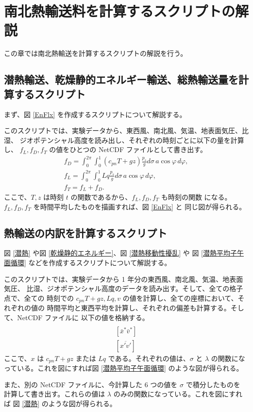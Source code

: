 \documentclass[body]{subfiles}
\begin{document}
\chapter{南北熱輸送料を計算するスクリプトの解説}

この章では南北熱輸送を計算するスクリプトの解説を行う。

\section{潜熱輸送、乾燥静的エネルギー輸送、総熱輸送量を計算するスクリプト}

まず、図 \ref{EnFlx} を作成するスクリプトについて解説する。

このスクリプトでは、実験データから、東西風、南北風、気温、地表面気圧、比湿、
ジオポテンシャル高度を読み出し、それぞれの時刻ごとに以下の量を計算し、
\(f_L,f_D,f_T\) の値をひとつの NetCDF ファイルとして書き出す。
\begin{gather}
	f_D=\int^{2\pi}_0\int^1_0 (c_{pn}T+gz)\frac{p_s}{g}d\sigma\,a\cos\varphi\,d\varphi,\\
	f_L=\int^{2\pi}_0\int^1_0 Lq\frac{p_s}{g}d\sigma\,a\cos\varphi\,d\varphi,\\
	f_T=f_L+f_D.
\end{gather}
ここで、\(T,z\) は時刻 \(t\) の関数であるから、\(f_L,f_D,f_T\) も時刻の関数
になる。\(f_L,f_D,f_T\) を時間平均したものを描画すれば、図 \ref{EnFlx} と
同じ図が得られる。

\section{熱輸送の内訳を計算するスクリプト}

図 \ref{潜熱} や図 \ref{乾燥静的エネルギー}、図 \ref{潜熱移動性擾乱} や
図 \ref{潜熱平均子午面循環} などを作成するスクリプトについて解説する。

このスクリプトでは、実験データから 1 年分の東西風、南北風、気温、地表面気圧、
比湿、ジオポテンシャル高度のデータを読み出す。そして、全ての格子点で、全ての
時刻での \(c_{pn}T+gz, Lq, v\) の値を計算し、全ての座標において、それぞれの値の
時間平均と東西平均を計算し、それぞれの偏差も計算する。そして、NetCDF ファイルに
以下の値を格納する。
\begin{gather}
	[\bar v][\bar v]\\
	[\bar x^*\bar v^*]\\
	[\overline{x'v'}]
\end{gather}
ここで、\(x\) は \(c_{pn}T+gz\) または \(Lq\) である。それぞれの値は、\(\sigma\)
と \(\lambda\) の関数になっている。これを図にすれば図 \ref{潜熱平均子午面循環}
のような図が得られる。

また、別の NetCDF ファイルに、今計算した 6 つの値を \(\sigma\) で積分したものを
計算して書き出す。これらの値は \(\lambda\) のみの関数になっている。これを図にすれば
図 \ref{潜熱} のような図が得られる。
\end{document}
